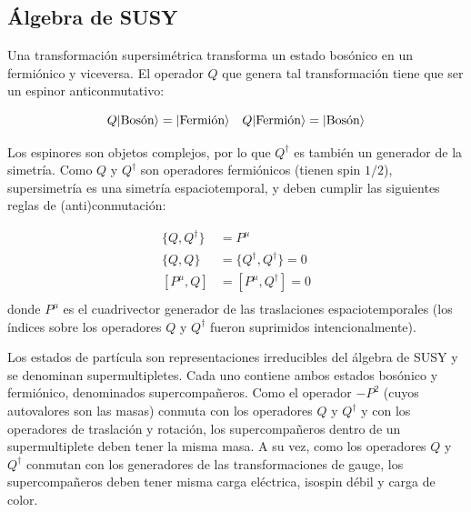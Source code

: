 \subsection{Álgebra de SUSY}

Una transformación supersimétrica transforma un estado bosónico en un fermiónico y viceversa. El operador $Q$ que genera tal transformación tiene que ser un espinor anticonmutativo:

\begin{equation}
	Q\lvert\text{Bosón}\rangle = \lvert\text{Fermión}\rangle \quad Q\lvert\text{Fermión}\rangle = \lvert\text{Bosón}\rangle
\end{equation}

Los espinores son objetos complejos, por lo que $Q^{\dagger}$ es también un generador de la simetría. Como $Q$ y $Q^{\dagger}$ son operadores fermiónicos (tienen spin $1/2$), supersimetría es una simetría espaciotemporal, y deben cumplir las siguientes reglas de (anti)conmutación:

\begin{equation}
	\begin{split}	
		\{Q,Q^{\dagger}\} & = P^{\mu}\\
		\{Q,Q\} & = \{Q^{\dagger},Q^{\dagger}\} = 0\\
		[P^{\mu},Q] & = [P^{\mu},Q^{\dagger}] = 0\\
	\end{split}	
\end{equation}
%
donde $P^{\mu}$ es el cuadrivector generador de las traslaciones espaciotemporales (los índices sobre los operadores $Q$ y $Q^{\dagger}$ fueron suprimidos intencionalmente).


Los estados de partícula son representaciones irreducibles del álgebra de SUSY y se denominan supermultipletes. Cada uno contiene ambos estados bosónico y fermiónico, denominados supercompañeros. Como el operador $-P^2$ (cuyos autovalores son las masas) conmuta con los operadores $Q$ y $Q^{\dagger}$ y con los operadores de traslación y rotación, los supercompañeros dentro de un supermultiplete deben tener la misma masa. A su vez, como los operadores $Q$ y $Q^{\dagger}$ conmutan con los generadores de las transformaciones de gauge, los supercompañeros deben tener misma carga eléctrica, isospin débil y carga de color.

